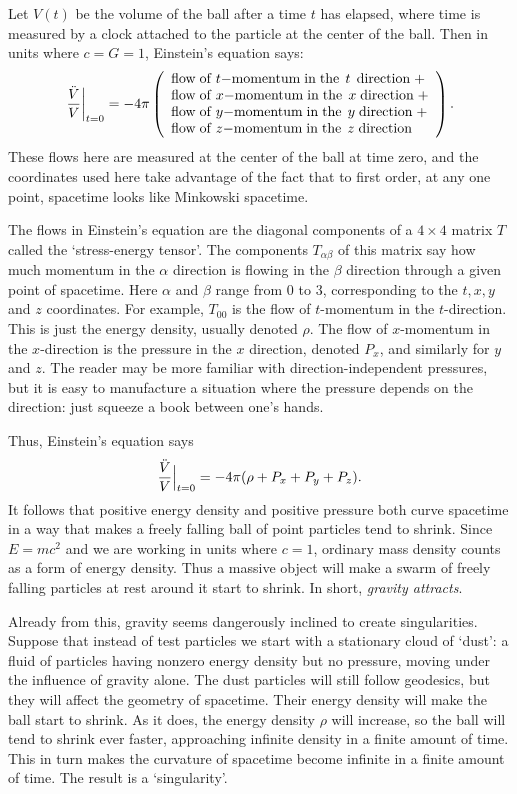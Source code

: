 \documentclass{article}
\begin{document}
Let $V(t)$ be the volume of the ball after a time $t$ has elapsed, where time is measured by a clock attached to the particle at the center of the ball.  Then in units where $c = G = 1$, Einstein's equation says: 
\[ \left.{\ddot V\over V} \right|_{t = 0} =
 -4\pi \left( \begin{array}{l} 
{\rm flow \; of \;} t{\rm -momentum \; in \; the \;\,} t {\rm \,\; direction \;} + \\ 
{\rm flow \; of \;} x{\rm -momentum \; in \; the \;\,} x {\rm \; direction \;} + \\ 
{\rm flow \; of \;} y{\rm -momentum \; in \; the \;\,} y {\rm \; direction \;} + \\ 
{\rm flow \; of \;} z{\rm -momentum \; in \; the \;\,} z {\rm \; direction} 
\end{array} \right) .\] 
These flows here are measured at the center of the ball at time zero, and the coordinates used here take advantage of the fact that to first order, at any one point, spacetime looks like Minkowski spacetime.  

The flows in Einstein's equation are the diagonal components of a $4 \times 4$ matrix $T$ called the `stress-energy tensor'.  The components $T_{\alpha \beta}$ of this matrix say how much momentum in the $\alpha$ direction is flowing in the $\beta$ direction through a given point of spacetime.   Here $\alpha$ and $\beta$ range from $0$ to $3$, corresponding to the $t,x,y$ and $z$ coordinates.  For example, $T_{00}$ is the flow of $t$-momentum in the $t$-direction.  This is just the energy density, usually denoted $\rho$.  The flow of $x$-momentum in the $x$-direction is the pressure in the $x$ direction, denoted $P_x$, and similarly for $y$ and $z$.   The reader may be more familiar with direction-independent pressures, but it is easy to manufacture a situation where the pressure depends on the direction: just squeeze a book between one's hands.   

Thus, Einstein's equation says
\[   {\ddot V\over V} \Bigr|_{t = 0} 
= -4\pi (\rho + P_x + P_y + P_z).  \]
It follows that positive energy density and positive pressure both curve spacetime in a way that makes a freely falling ball of point particles tend to shrink.  Since $E = mc^2$ and we are working in units where $c = 1$, ordinary mass density counts as a form of energy density.  Thus a massive object will make a swarm of freely falling particles at rest around it start to shrink.  In short, \emph{gravity attracts}.

Already from this, gravity seems dangerously inclined to create singularities.  Suppose that instead of test particles we start with a stationary cloud of `dust': a fluid of particles having nonzero energy density but no pressure, moving under the influence of gravity alone.  The dust particles will still follow geodesics, but they will affect the geometry of spacetime.  Their energy density will make the ball start to shrink.  As it does, the energy density $\rho$ will increase, so the ball will tend to shrink ever faster, approaching infinite density in a finite amount of time.   This in turn makes the curvature of spacetime become infinite in a finite amount of time.  The result is a `singularity'. 
\end{document}
